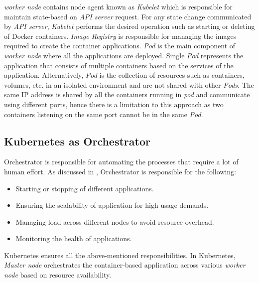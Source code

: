   \emph{worker node} contains node agent known as \emph{Kubelet} which is responsible for maintain state-based on \emph{API server} request\cite{Santos2019}. For any state change communicated by \emph{API server}, \emph{Kubelet} performs the desired operation such as starting or deleting of Docker containers\cite{Santos2019}. \emph{Image Registry} is responsible for managing the images required to create the container applications. \emph{Pod} is the main component of \emph{worker node} where all the applications are deployed. Single \emph{Pod} represents the application that consists of multiple containers based on the services of the application. Alternatively, \emph{Pod} is the collection of resources such as containers, volumes, etc. in an isolated environment and are not shared with other \emph{Pods}\cite{Santos2019}. The same IP address is shared by all the containers running in \emph{pod} and communicate using different ports, hence there is a limitation to this approach as two containers listening on the same port cannot be in the same \emph{Pod}\cite{Santos2019}.
  \subsection{Kubernetes as Orchestrator}
  \label{sec:k8s_orchestrator}
  Orchestrator is responsible for automating the processes that require a lot of human effort. As discussed in \cite{containerjournal}, Orchestrator is responsible for the following:
  \begin{itemize}
    \item Starting or stopping of different applications.
    \item Ensuring the scalability of application for high usage demands.
    \item Managing load across different nodes to avoid resource overhead.
    \item Monitoring the health of applications.
  \end{itemize}
  Kubernetes ensures all the above-mentioned responsibilities. In Kubernetes, \emph{Master node} orchestrates the container-based application across various \emph{worker node} based on resource availability\cite{k8s}.
